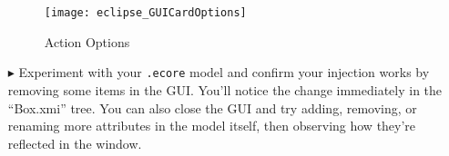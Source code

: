 \begin{itemize}
\begin{figure}[htbp]
    \centering
    \texttt{[image: eclipse\_GUICardOptions]}
    \caption{Action Options}
    \label{fig:GUI_cardOptions}
\end{figure}

\vspace{1cm}

\item[$\blacktriangleright$] Experiment with your \texttt{.ecore} model and confirm your injection works by removing some items in the GUI.  You'll notice the change immediately in the
``Box.xmi'' tree. You can also close the GUI and try adding, removing, or renaming more attributes in the model itself, then observing how they're reflected
in the window.


\end{itemize}
